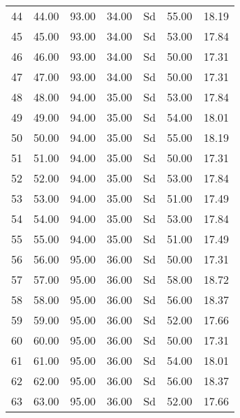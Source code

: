 \begin{center}
\begin{longtable}{|p{0.4in}|p{0.7in}|p{0.6in}|p{0.6in}|p{0.6in}|p{0.6in}|p{0.6in}|}
  44 & 44.00 & 93.00 & 34.00 & Sd & 55.00 & 18.19 \\ 
  45 & 45.00 & 93.00 & 34.00 & Sd & 53.00 & 17.84 \\ 
  46 & 46.00 & 93.00 & 34.00 & Sd & 50.00 & 17.31 \\ 
  47 & 47.00 & 93.00 & 34.00 & Sd & 50.00 & 17.31 \\ 
  48 & 48.00 & 94.00 & 35.00 & Sd & 53.00 & 17.84 \\ 
  49 & 49.00 & 94.00 & 35.00 & Sd & 54.00 & 18.01 \\ 
  50 & 50.00 & 94.00 & 35.00 & Sd & 55.00 & 18.19 \\ 
  51 & 51.00 & 94.00 & 35.00 & Sd & 50.00 & 17.31 \\ 
  52 & 52.00 & 94.00 & 35.00 & Sd & 53.00 & 17.84 \\ 
  53 & 53.00 & 94.00 & 35.00 & Sd & 51.00 & 17.49 \\ 
  54 & 54.00 & 94.00 & 35.00 & Sd & 53.00 & 17.84 \\ 
  55 & 55.00 & 94.00 & 35.00 & Sd & 51.00 & 17.49 \\ 
  56 & 56.00 & 95.00 & 36.00 & Sd & 50.00 & 17.31 \\ 
  57 & 57.00 & 95.00 & 36.00 & Sd & 58.00 & 18.72 \\ 
  58 & 58.00 & 95.00 & 36.00 & Sd & 56.00 & 18.37 \\ 
  59 & 59.00 & 95.00 & 36.00 & Sd & 52.00 & 17.66 \\ 
  60 & 60.00 & 95.00 & 36.00 & Sd & 50.00 & 17.31 \\ 
  61 & 61.00 & 95.00 & 36.00 & Sd & 54.00 & 18.01 \\ 
  62 & 62.00 & 95.00 & 36.00 & Sd & 56.00 & 18.37 \\ 
  63 & 63.00 & 95.00 & 36.00 & Sd & 52.00 & 17.66 \\ 
   \hline
\end{longtable}
\end{center}
%
